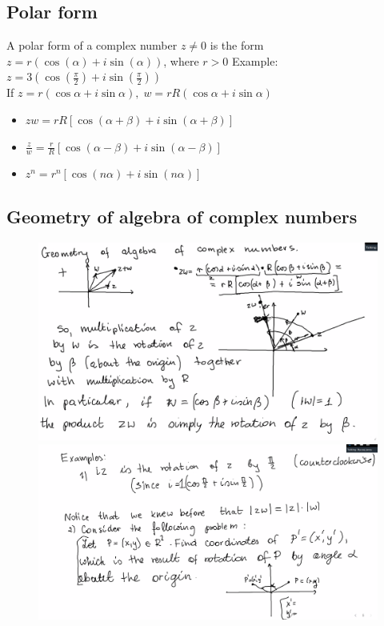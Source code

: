 \documentclass{article}
\begin{document}
\subsection{Polar form}
A polar form of a complex number $z\neq 0$ is the form $z=r(\cos(\alpha) + i\sin(\alpha))$, where $r>0$
Example: \\
\LARGE
$z = 3(\cos(\frac{\pi}{2}) + i\sin(\frac{\pi}{2}))$ \\
\large
If $z=r(\cos\alpha + i\sin\alpha), \; w=rR(\cos\alpha + i\sin\alpha)$\\
\begin{itemize}
	\item $zw = rR[\cos(\alpha + \beta) + i\sin(\alpha + \beta)]$
	\item $\frac{z}{w} = \frac{r}{R}[\cos(\alpha - \beta) + i\sin(\alpha - \beta)]$
	\item $z^n = r^n [\cos(n\alpha) + i\sin(n\alpha)]$
\end{itemize}
\pagebreak
\subsection{Geometry of algebra of complex numbers}
\begin{figure}[h!]
	\includegraphics[scale=0.25]{algebra-lecture1.png}
	\includegraphics[scale=0.25]{2.png}
	\centering
\end{figure}
\end{document}
